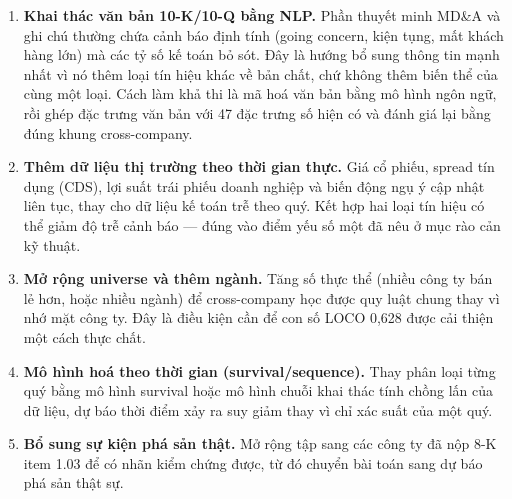\begin{enumerate}
\item \textbf{Khai thác văn bản 10-K/10-Q bằng NLP.} Phần thuyết minh MD\&A và ghi chú thường chứa
      cảnh báo định tính (going concern, kiện tụng, mất khách hàng lớn) mà các tỷ số kế toán bỏ sót.
      Đây là hướng bổ sung thông tin mạnh nhất vì nó thêm loại tín hiệu khác về bản chất, chứ không
      thêm biến thể của cùng một loại. Cách làm khả thi là mã hoá văn bản bằng mô hình ngôn ngữ, rồi
      ghép đặc trưng văn bản với 47 đặc trưng số hiện có và đánh giá lại bằng đúng khung cross-company.
\item \textbf{Thêm dữ liệu thị trường theo thời gian thực.} Giá cổ phiếu, spread tín dụng (CDS), lợi
      suất trái phiếu doanh nghiệp và biến động ngụ ý cập nhật liên tục, thay cho dữ liệu kế toán
      trễ theo quý. Kết hợp hai loại tín hiệu có thể giảm độ trễ cảnh báo — đúng vào điểm yếu số một
      đã nêu ở mục rào cản kỹ thuật.
\item \textbf{Mở rộng universe và thêm ngành.} Tăng số thực thể (nhiều công ty bán lẻ hơn, hoặc nhiều
      ngành) để cross-company học được quy luật chung thay vì nhớ mặt công ty. Đây là điều kiện cần
      để con số LOCO 0,628 được cải thiện một cách thực chất.
\item \textbf{Mô hình hoá theo thời gian (survival/sequence).} Thay phân loại từng quý bằng mô hình
      survival hoặc mô hình chuỗi khai thác tính chồng lấn của dữ liệu, dự báo thời điểm xảy ra suy
      giảm thay vì chỉ xác suất của một quý.
\item \textbf{Bổ sung sự kiện phá sản thật.} Mở rộng tập sang các công ty đã nộp 8-K item 1.03 để có
      nhãn kiểm chứng được, từ đó chuyển bài toán sang dự báo phá sản thật sự.
\end{enumerate}
